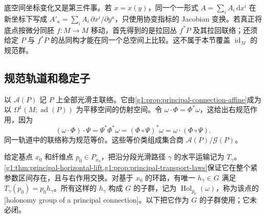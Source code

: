 底空间坐标变化又是第三件事。若 \(x=x(y)\)，同一个一形式 \(A=\sum_iA_i\,\mathrm{d}x^i\) 在新坐标下写成 \(A'_a=\sum_iA_i\,\partial x^i/\partial y^a\)，只使用协变指标的 Jacobian 变换。若真正将底点按微分同胚 \(f:M\to M\) 移动，首先得到的是拉回丛 \(f^*P\) 及其拉回联络；还须给定 \(P\) 与 \(f^*P\) 的丛同构才能在同一个总空间上比较。这不属于本节覆盖 \(\operatorname{id}_M\) 的规范群。

\subsection{规范轨道和稳定子}
\label{g1:subsec:1804:02}

以 \(\mathcal A(P)\) 记 \(P\) 上全部光滑主联络。它由\cref{g1:prop:principal-connection-affine}成为以 \(\Omega^1(M;\operatorname{ad}(P))\) 为平移空间的仿射空间。令 \(\omega\cdot\Phi=\Phi^*\omega\)，这给出右规范作用，因为
\[
	(\omega\cdot\Phi)\cdot\Psi=\Psi^*\Phi^*\omega
	=(\Phi\circ\Psi)^*\omega=\omega\cdot(\Phi\circ\Psi).
\]
同一轨道中的联络称为规范等价。这些等价类组成集合商 \(\mathcal A(P)/\mathcal G(P)\)。

\ProseParagraphBreak

给定基点 \(x_0\) 和纤维点 \(p_0\in P_{x_0}\)，把沿分段光滑路径 \(\gamma\) 的水平运输记为 \(T_\gamma\)。\cref{g1:thm:principal-horizontal-lift,g1:prop:principal-transport-laws}保证它在整个紧参数区间存在，且与右作用交换。对基于 \(x_0\) 的环路，有唯一 \(h_\gamma\in G\) 满足 \(T_\gamma(p_0)=p_0h_\gamma\)。所有这样的 \(h_\gamma\) 构成 \(G\) 的子群，记为 \(\operatorname{Hol}_{p_0}(\omega)\)，称为该点的[holonomy group of a principal connection]。以下把它作为 \(G\) 的子群使用；它未必闭。

